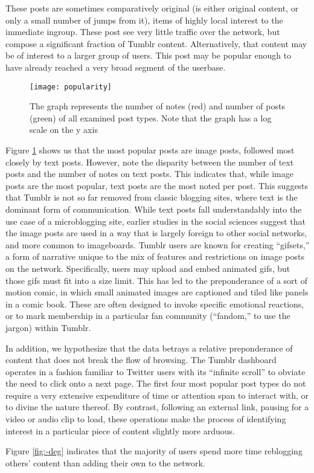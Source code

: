 These posts are sometimes comparatively original 
(is either original content, or only a small number of jumps from it),
items of highly local interest to the immediate ingroup. These post see
very little traffic over the network, but compose a significant 
fraction of Tumblr content.  Alternatively, that content may be of 
interest to a larger group of users.  This post may be popular enough 
to have already reached a very broad segment of the userbase.


\begin{figure}[bht]
\centering
 \texttt{[image: popularity]}
  \caption{The graph represents the number of notes (red) and number of posts (green) 
    of all examined post types.  Note that the graph has a log scale on the y axis}
  \label{fig:-pop}
\end{figure}


Figure \ref{fig:-pop} shows us that the most popular posts are image 
posts, followed most closely by text posts.  However, note the disparity 
between the number of text posts and the number of notes on text posts.  
This indicates that, while image posts are the most popular, text posts 
are the most noted per post.  This suggests that Tumblr is not so far 
removed from classic blogging sites, where text is the dominant form 
of communication.  While text posts fall understandably into the use 
case of a microblogging site, earlier studies in the social 
sciences\cite{thomas2012revisioning,hillman2014tumblr} suggest that 
the image posts are used in a way that is largely foreign to other 
social networks, and more common to imageboards.  Tumblr users are known 
for creating ``gifsets,'' a form of narrative unique to the mix of 
features and restrictions on image posts on the network.  Specifically, 
users may upload and embed animated gifs, but those gifs must fit into 
a size limit.  This has led to the preponderance of a sort of motion 
comic, in which small animated images are captioned and tiled like 
panels in a comic book.  These are often designed to invoke specific 
emotional reactions, or to mark membership in a particular fan 
community (``fandom,'' to use the jargon) within Tumblr.  



In addition, we hypothesize that the data betrays a relative 
preponderance of content that does not break the flow of browsing.  
The Tumblr dashboard operates in a fashion familiar to Twitter users 
with its ``infinite scroll'' to obviate the need to click onto a next 
page.  The first four most popular post types do not require a very 
extensive expenditure of time or attention span to interact with, or 
to divine the nature thereof.  By contrast, following an external link, 
pausing for a video or audio clip to load, these operations make the 
process of identifying interest in a particular piece of content 
slightly more arduous.





Figure \ref{fig:-deg} indicates that the majority of users spend more 
time reblogging others' content than adding their own to the network.






